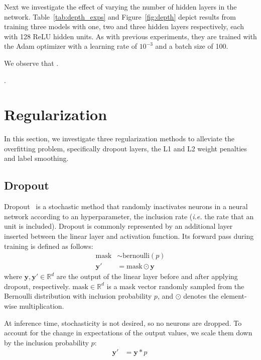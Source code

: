 \documentclass{article}
\begin{document}
\questionTableTwo
\questionFigureThree

Next we investigate the effect of varying the number of hidden layers in the network. 
Table~\ref{tab:depth_exps} and Figure~\ref{fig:depth} depict results from training three models with one, two and three hidden layers respectively, each with 128 ReLU hidden units. 
As with previous experiments, they are trained with the Adam optimizer with a learning rate of $10^{-3}$ and a batch size of 100. 

We observe that \questionFour.

\questionFive.




\section{Regularization}
\label{sec:task2.1} 

In this section, we investigate three regularization methods to alleviate the overfitting problem, specifically dropout layers, the L1 and L2 weight penalties and label smoothing.


\subsection{Dropout}

Dropout~\cite{srivastava2014dropout} is a stochastic method that randomly inactivates neurons in a neural network according to an hyperparameter, the inclusion rate  (\textit{i.e.} the rate that an unit is included).
Dropout is commonly represented by an additional layer inserted between the linear layer and activation function.
Its forward pass during training is defined as follows:
\begin{align}
    \text{mask} &\sim \text{bernoulli}(p)\\
    \bm{y}' &= \text{mask} \odot \bm{y}\
\end{align}
where $\bm{y}, \bm{y}' \in \mathbb{R}^d$ are the output of the linear layer before and after applying dropout, respectively. 
$\text{mask} \in \mathbb{R}^d$ is a mask vector randomly sampled from the Bernoulli distribution with inclusion probability $p$, and $\odot$ denotes the element-wise multiplication.

At inference time, stochasticity is not desired, so no neurons are dropped. 
To account for the change in expectations of the output values, we scale them down by the inclusion probability $p$:
\begin{align}
    \bm{y}' &= \bm{y}*p\
\end{align}
\end{document}
